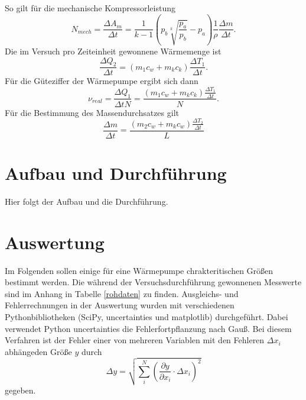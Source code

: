 \documentclass[11pt]{article}
\begin{document}
So gilt für die mechanische Kompressorleistung
\begin{equation}
\label{F7}
N_{mech} = \frac{\Delta A_m}{\Delta t} = \frac{1}{k-1} \left(p_b \sqrt[k]{\frac{p_a}{p_b}}-p_a \right) \frac{1}{\rho} \frac{\Delta m}{\Delta t}.
\end{equation}
Die im Versuch pro Zeiteinheit gewonnene Wärmemenge ist
\begin{equation}
\label{F8}
\frac{\Delta Q_2}{\Delta t} = (m_1c_w + m_kc_k) \frac{\Delta T_1}{\Delta t}.
\end{equation}
Für die Güteziffer der Wärmepumpe ergibt sich dann
\begin{equation}
\label{F9}
\nu_{real} = \frac{\Delta Q_1}{\Delta t N} = \frac{(m_1c_w + m_kc_k) \frac{\Delta T_1}{\Delta t}}{N}.
\end{equation}
Für die Bestimmung des Massendurchsatzes gilt
\begin{equation}
\label{F10}
\frac{\Delta m}{\Delta t} = \frac{(m_2 c_w + m_k c_w) \frac{\Delta T_2}{\Delta t}}{L}
\end{equation}

\section{Aufbau und Durchf\"{u}hrung}
Hier folgt der Aufbau und die Durchführung.
\section{Auswertung}
Im Folgenden sollen einige f\"ur eine W\"armepumpe chrakteritischen Gr\"o\ss en bestimmt werden. Die w\"ahrend der Versuchsdurchf\"uhrung gewonnenen Messwerte sind im Anhang in Tabelle \ref{rohdaten} zu finden. Ausgleichs- und Fehlerrechnungen in der Auswertung wurden mit verschiedenen Pythonbibliotheken (SciPy, uncertainties und matplotlib) durchgef\"uhrt. Dabei verwendet Python uncertainties die Fehlerfortpflanzung nach Gau\ss. Bei diesem Verfahren ist der Fehler einer von mehreren Variablen mit den Fehleren $\Delta x_i$ abh\"angeden Gr\"o\ss e $y$ durch 
\begin{equation}
\Delta y = \sqrt{\sum_i^N (\frac{\partial y}{\partial x_i} \cdot \Delta x_i)^2}
\end{equation}
gegeben. 
\end{document}
